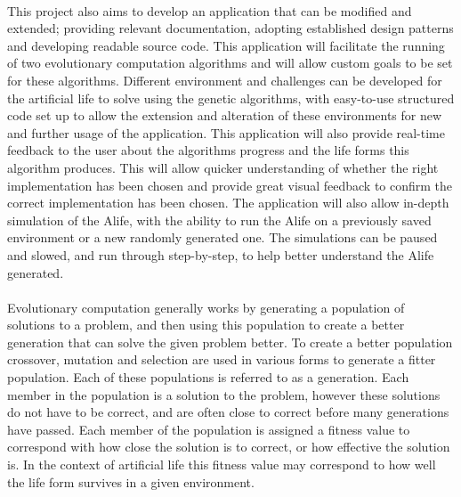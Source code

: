 \documentclass[12pt]{article}
\begin{document}
\paragraph{}
This project also aims to develop an application that can be modified and extended; providing relevant documentation, adopting established design
patterns and developing readable source code. This application will facilitate the running of two evolutionary computation algorithms and will allow
custom goals to be set for these algorithms. Different environment and challenges can be developed for the artificial life to solve using the 
genetic algorithms, with easy-to-use structured code set up to allow the extension and alteration of these environments for new and further
usage of the application. This application will also provide real-time feedback to the user about the algorithms progress and the life forms
this algorithm produces. This will allow quicker understanding of whether the right implementation has been chosen and provide great visual feedback
to confirm the correct implementation has been chosen. The application will also allow in-depth simulation of the Alife, with the ability to 
run the Alife on a previously saved environment or a new randomly generated one. The simulations can be paused and slowed, and run through 
step-by-step, to help better understand the Alife generated.


\paragraph{}
Evolutionary computation generally works by generating a population of solutions to a problem, and then using this population to create a better generation that can solve the given problem better.
To create a better population crossover, mutation and selection are used in various forms to generate a fitter population.
Each of these populations is referred to as a generation.
Each member in the population is a solution to the problem, however these solutions do not have to be correct, and are often close to correct before many generations have passed.
Each member of the population is assigned a fitness value to correspond with how close the solution is to correct, or how effective the solution is.
In the context of artificial life this fitness value may correspond to how well the life form survives in a given environment.
\end{document}
